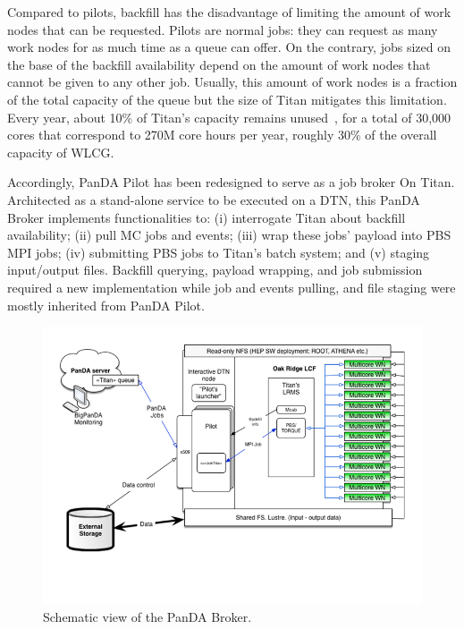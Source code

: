 Compared to pilots, backfill has the disadvantage of limiting the amount of work
nodes that can be requested. Pilots are normal jobs: they can request as many
work nodes for as much time as a queue can offer. On the contrary, jobs sized on
the base of the backfill availability depend on the amount of work nodes that
cannot be given to any other job. Usually, this amount of work nodes is a
fraction of the total capacity of the queue but the size of Titan mitigates this
limitation. Every year, about 10\% of Titan's capacity remains
unused~\cite{titan_utilization}, for a total of 30,000 cores that correspond to
270M core hours per year, roughly 30\% of the overall capacity of WLCG.



Accordingly, PanDA Pilot has been redesigned to serve as a job broker On Titan.
Architected as a stand-alone service to be executed on a DTN, this PanDA Broker
implements functionalities to: (i) interrogate Titan about backfill
availability; (ii) pull MC jobs and events; (iii) wrap these jobs' payload into
PBS MPI jobs; (iv) submitting PBS jobs to Titan's batch system; and (v) staging
input/output files. Backfill querying, payload wrapping, and job submission
required a new implementation while job and events pulling, and file staging
were mostly inherited from PanDA Pilot.

\begin{figure}
  \begin{center}
    \includegraphics[width=\columnwidth]{figures/PanDA_setup_at_OLCF.png}
    \caption{Schematic view of the PanDA Broker.}
  \end{center}
\label{fig:panda_broker}
\end{figure}

